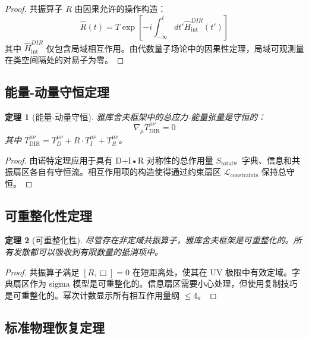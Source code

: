 \documentclass[11pt,a4paper]{article}
\newtheorem{theorem}{定理}
\begin{document}
	\begin{proof}
		共振算子 $R$ 由因果允许的操作构造：
		\begin{equation}
			\hat{R}(t) = T \exp\left[ -i \int_{-\infty}^t dt' \hat{H}_{\text{int}}^{DIR}(t') \right]
		\end{equation}
		其中 $\hat{H}_{\text{int}}^{DIR}$ 仅包含局域相互作用。由代数量子场论中的因果性定理，局域可观测量在类空间隔处的对易子为零。
	\end{proof}
	
	\subsection{能量-动量守恒定理}
	
	\begin{theorem}[能量-动量守恒]
		雅库舍夫框架中的总应力-能量张量是守恒的：
		\begin{equation}
			\boxed{\nabla_\mu T^{\mu\nu}_{\text{DIR}} = 0}
		\end{equation}
		其中 $T^{\mu\nu}_{\text{DIR}} = T^{\mu\nu}_D + R \cdot T^{\mu\nu}_I + T^{\mu\nu}_R$。
	\end{theorem}
	
	\begin{proof}
		由诺特定理应用于具有 D+I•R 对称性的总作用量 $S_{\text{total}}$。字典、信息和共振扇区各自有守恒流。相互作用项的构造使得通过约束扇区 $\mathcal{L}_{\text{constraints}}$ 保持总守恒。
	\end{proof}
	
	\subsection{可重整化性定理}
	
	\begin{theorem}[可重整化性]
		尽管存在非定域共振算子，雅库舍夫框架是可重整化的。所有发散都可以吸收到有限数量的抵消项中。
	\end{theorem}
	
	\begin{proof}
		共振算子满足 $[R, \Box] = 0$ 在短距离处，使其在 UV 极限中有效定域。字典扇区作为 sigma 模型是可重整化的。信息扇区需要小心处理，但使用复制技巧是可重整化的。幂次计数显示所有相互作用量纲 $\leq 4$。
	\end{proof}
	
	\subsection{标准物理恢复定理}
	
\end{document}
